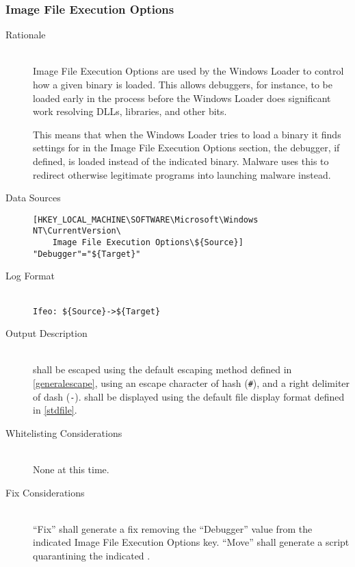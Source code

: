 \subsubsection{Image File Execution Options}
\begin{description}
\item[Rationale] \hfill \\
Image File Execution Options are used by the Windows Loader to control how a
given binary is loaded. This allows debuggers, for instance, to be loaded early
in the process before the Windows Loader does significant work resolving DLLs,
libraries, and other bits.

This means that when the Windows Loader tries to load a binary it finds settings
for in the Image File Execution Options section, the debugger, if defined, is
loaded instead of the indicated binary. Malware uses this to redirect
otherwise legitimate programs into launching malware instead.
\item[Data Sources] \hfill
\vspace{-\baselineskip}
\begin{verbatim}
[HKEY_LOCAL_MACHINE\SOFTWARE\Microsoft\Windows NT\CurrentVersion\
    Image File Execution Options\${Source}]
"Debugger"="${Target}"
\end{verbatim}
\item[Log Format] \hfill \\
\verb|Ifeo: ${Source}->${Target}|
\item[Output Description] \hfill \\
 shall be escaped using the default escaping method defined in
\ref{generalescape}, using an escape character of hash (\verb|#|), and a right
delimiter of dash (\verb|-|). \var{Target} shall be displayed using the default
file display format defined in \ref{stdfile}.
\item[Whitelisting Considerations] \hfill \\
None at this time.
\item[Fix Considerations] \hfill \\
``Fix'' shall generate a fix removing the ``Debugger'' value from the indicated
Image File Execution Options key. ``Move'' shall generate a script quarantining
the indicated \var{Target}.
\end{description}

